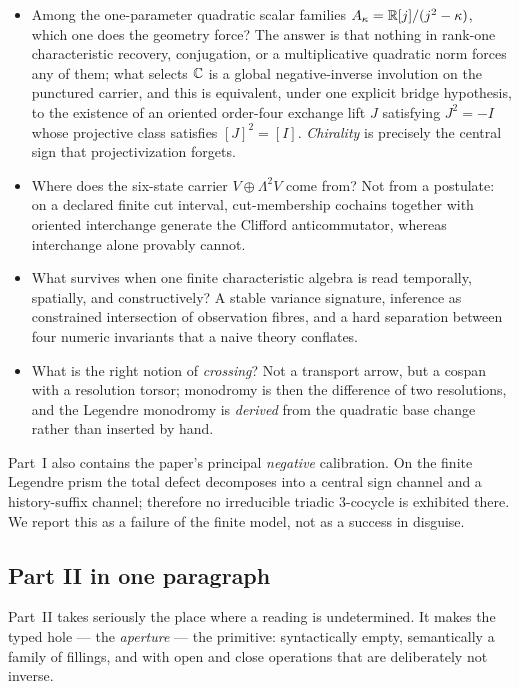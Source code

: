 \begin{itemize}
\item Among the one-parameter quadratic scalar families
  $A_\kappa=\mathbb{R}[j]/(j^2-\kappa)$, which one does the geometry force?  The answer is
  that nothing in rank-one characteristic recovery, conjugation, or a multiplicative
  quadratic norm forces any of them; what selects $\mathbb{C}$ is a global negative-inverse
  involution on the punctured carrier, and this is equivalent, under one explicit
  bridge hypothesis, to the existence of an oriented order-four exchange lift
  $J$ satisfying $J^2=-I$ whose projective class satisfies $[J]^2=[I]$.
  \emph{Chirality} is precisely the central sign that projectivization forgets.
\item Where does the six-state carrier $V\oplus\Lambda^2 V$ come from?  Not from a
  postulate: on a declared finite cut interval, cut-membership cochains together
  with oriented interchange generate the Clifford anticommutator, whereas
  interchange alone provably cannot.
\item What survives when one finite characteristic algebra is read temporally,
  spatially, and constructively?  A stable variance signature, inference as
  constrained intersection of observation fibres, and a hard separation between four
  numeric invariants that a naive theory conflates.
\item What is the right notion of \emph{crossing}?  Not a transport arrow, but a
  cospan with a resolution torsor; monodromy is then the difference of two
  resolutions, and the Legendre monodromy is \emph{derived} from the quadratic base
  change rather than inserted by hand.
\end{itemize}

Part~I also contains the paper's principal \emph{negative} calibration.  On the
finite Legendre prism the total defect decomposes into a central sign channel and a
history-suffix channel; therefore no irreducible triadic $3$-cocycle is exhibited
there.  We report this as a failure of the finite model, not as a success in
disguise.

\subsection{Part II in one paragraph}

Part~II takes seriously the place where a reading is undetermined.  It makes the
typed hole --- the \emph{aperture} --- the primitive: syntactically empty,
semantically a family of fillings, and with open and close operations that are
deliberately not inverse.

